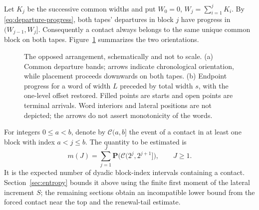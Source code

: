 Let $K_j$ be the successive common widths and put
$W_0=0$, $W_j=\sum_{i=1}^jK_i$.  By
\eqref{eq:departure-progress}, both tapes' departures in block
$j$ have progress in $(W_{j-1},W_j]$.  Consequently a contact
always belongs to the same unique common block on both tapes.
Figure~\ref{fig:arrangement} summarizes the two orientations.
\begin{figure}[tbp]
 \centering
 
 \caption{The opposed arrangement, schematically and not to scale.
 (a) Common departure bands; arrows indicate chronological orientation,
 while placement proceeds downwards on both tapes. (b) Endpoint progress
 for a word of width $L$ preceded by total width $s$, with the one-level
 offset restored. Filled points are starts and open points are terminal
 arrivals. Word interiors and lateral positions are not depicted;
 the arrows do not assert monotonicity of the words.}
 \label{fig:arrangement}
\end{figure}
For integers $0\le a<b$, denote by $\mathcal C(a,b]$ the event
of a contact in at least one block with index $a<j\le b$.
The quantity to be estimated is
\begin{equation}\label{eq:contact-count}
 m(J)=\sum_{j=1}^J\mathbf P\bigl(\mathcal C(2^j,2^{j+1}]\bigr),
 \qquad J\ge1.
\end{equation}
It is the expected number of dyadic block-index intervals containing
a contact.  Section~\ref{sec:entropy} bounds it above using the
finite first moment of the lateral increment $S$; the remaining
sections obtain an incompatible lower bound from the forced contact
near the top and the renewal-tail estimate.
